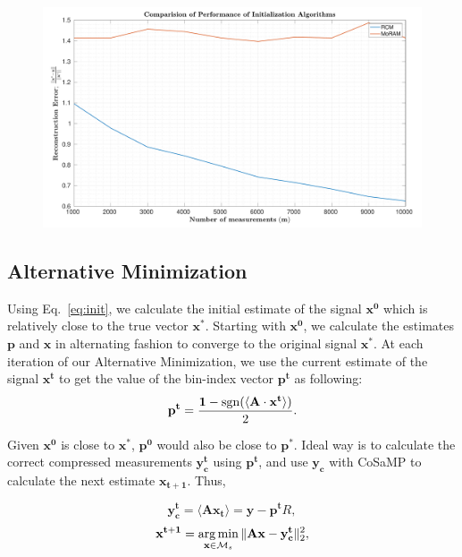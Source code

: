  \begin{figure}[t]
 	\begin{center}
 		\includegraphics[width=\linewidth]{./fig/MoRAM_RCM_compare.pdf}
 	\end{center}
 	\caption{}
 	\label{fig:init_comp}
 \end{figure}

\subsection{Alternative Minimization}
\label{sec:altmin}

Using Eq.~\ref{eq:init}, we calculate the initial estimate of the signal $\mathbf{{x}^0}$ which is relatively close to the true vector $\mathbf{x^*}$. Starting with $\mathbf{{x}^0}$, we  calculate the estimates $\mathbf{p}$ and $\mathbf{x}$ in alternating fashion to converge to the original signal $\mathbf{x^*}$. At each iteration of our Alternative Minimization, we use the current estimate of the signal ${\mathbf{x^t}}$ to get the value of the bin-index vector $\mathbf{{p}^t}$ as following:
\begin{equation}
\mathbf{{p}^{t}} = \frac{\mathbf{1}-\mathrm{sgn}(\langle \mathbf{A} \cdot \mathbf{x^t} \rangle)}{2}.
\label{step1}
\end{equation}

 
 Given $\mathbf{x^0}$ is close to $\mathbf{x^*}$, $\mathbf{p^0}$ would also be close to $\mathbf{p^*}$. Ideal way is to calculate the correct compressed measurements $\mathbf{y^t_c}$ using $\mathbf{p^t}$, and use $\mathbf{y_c}$ with CoSaMP to calculate the next estimate $\mathbf{{x}_{t+1}}$. Thus,


$$
\mathbf{y^t_c} = \langle \mathbf{A}\mathbf{x_{t}} \rangle = \mathbf{y} - \mathbf{p^t}R,
$$
$$
\mathbf{{x}^{t+1}} = \argmin_{\mathbf{x} \in \mathcal{M}_s}\norm{\mathbf{Ax} - \mathbf{y^t_c}}_2^2, %
$$

